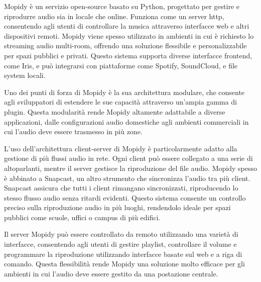 Mopidy è un servizio open-source  basato su Python, progettato per gestire e riprodurre audio sia in locale che online. Funziona come un server \gls{http}, consentendo agli utenti di controllare la musica attraverso interfacce web e altri dispositivi remoti. Mopidy viene spesso utilizzato in ambienti in cui è richiesto lo streaming audio multi-room, offrendo una soluzione flessibile e personalizzabile per spazi pubblici e privati. Questo sistema supporta diverse interfacce frontend, come Iris, e può integrarsi con piattaforme come Spotify, SoundCloud, e file system locali.

Uno dei punti di forza di Mopidy è la sua architettura modulare, che consente agli sviluppatori di estendere le sue capacità attraverso un'ampia gamma di plugin. Questa modularità rende Mopidy altamente adattabile a diverse applicazioni, dalle configurazioni audio domestiche agli ambienti commerciali in cui l'audio deve essere trasmesso in più zone.

L'uso dell'architettura client-server di Mopidy è particolarmente adatto alla gestione di più flussi audio in rete. Ogni client può essere collegato a una serie di altoparlanti, mentre il server gestisce la riproduzione del file audio. Mopidy spesso è abbinato a Snapcast, un altro strumento che sincronizza l'audio tra più client. Snapcast assicura che tutti i client rimangano sincronizzati, riproducendo lo stesso flusso audio senza ritardi evidenti. Questo sistema consente un controllo preciso sulla riproduzione audio in più luoghi, rendendolo ideale per spazi pubblici come scuole, uffici o campus di più edifici.

Il server Mopidy può essere controllato da remoto utilizzando una varietà di interfacce, consentendo agli utenti di gestire playlist, controllare il volume e programmare la riproduzione utilizzando interfacce basate sul web e a riga di comando. Questa flessibilità rende Mopidy una soluzione molto efficace per gli ambienti in cui l'audio deve essere gestito da una postazione centrale.~\cite{cit-mopidy}

